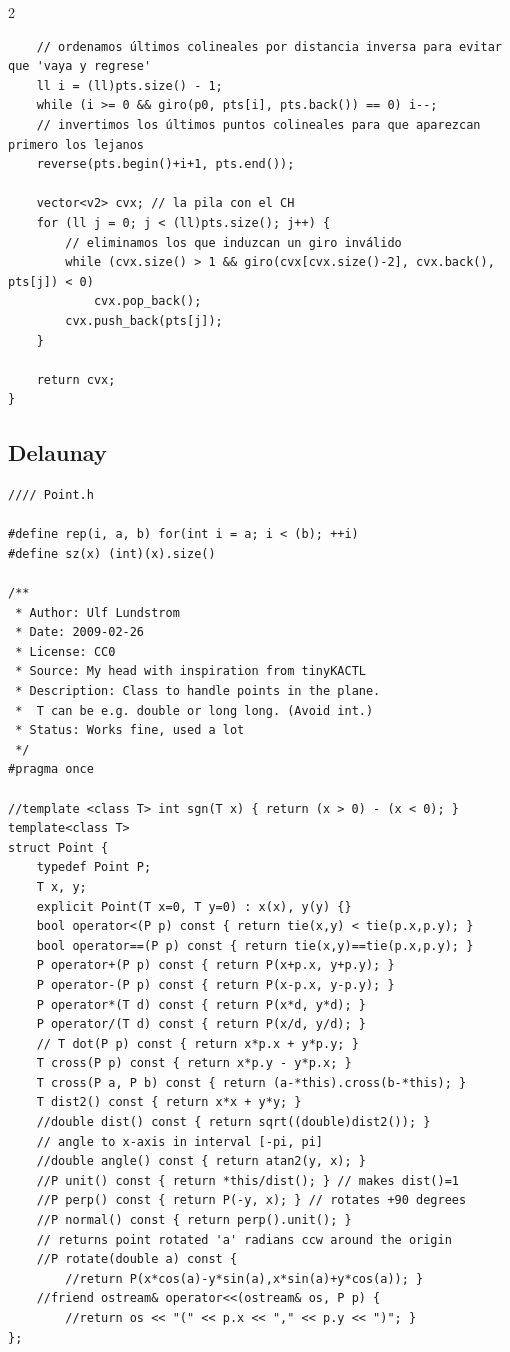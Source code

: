 \documentclass[twoside]{article}
\begin{document}
\begin{multicols*}{2}
\begin{verbatim}
    // ordenamos últimos colineales por distancia inversa para evitar que 'vaya y regrese'
    ll i = (ll)pts.size() - 1;
    while (i >= 0 && giro(p0, pts[i], pts.back()) == 0) i--;
    // invertimos los últimos puntos colineales para que aparezcan primero los lejanos
    reverse(pts.begin()+i+1, pts.end());

    vector<v2> cvx; // la pila con el CH
    for (ll j = 0; j < (ll)pts.size(); j++) {
        // eliminamos los que induzcan un giro inválido
        while (cvx.size() > 1 && giro(cvx[cvx.size()-2], cvx.back(), pts[j]) < 0)
            cvx.pop_back();
        cvx.push_back(pts[j]);
    }

    return cvx;
}

\end{verbatim}

	{
		\subsection*{Delaunay}
	}
	\begin{verbatim}
//// Point.h

#define rep(i, a, b) for(int i = a; i < (b); ++i)
#define sz(x) (int)(x).size()

/**
 * Author: Ulf Lundstrom
 * Date: 2009-02-26
 * License: CC0
 * Source: My head with inspiration from tinyKACTL
 * Description: Class to handle points in the plane.
 * 	T can be e.g. double or long long. (Avoid int.)
 * Status: Works fine, used a lot
 */
#pragma once

//template <class T> int sgn(T x) { return (x > 0) - (x < 0); }
template<class T>
struct Point {
	typedef Point P;
	T x, y;
	explicit Point(T x=0, T y=0) : x(x), y(y) {}
	bool operator<(P p) const { return tie(x,y) < tie(p.x,p.y); }
	bool operator==(P p) const { return tie(x,y)==tie(p.x,p.y); }
	P operator+(P p) const { return P(x+p.x, y+p.y); }
	P operator-(P p) const { return P(x-p.x, y-p.y); }
	P operator*(T d) const { return P(x*d, y*d); }
	P operator/(T d) const { return P(x/d, y/d); }
	// T dot(P p) const { return x*p.x + y*p.y; }
	T cross(P p) const { return x*p.y - y*p.x; }
	T cross(P a, P b) const { return (a-*this).cross(b-*this); }
	T dist2() const { return x*x + y*y; }
	//double dist() const { return sqrt((double)dist2()); }
	// angle to x-axis in interval [-pi, pi]
	//double angle() const { return atan2(y, x); }
	//P unit() const { return *this/dist(); } // makes dist()=1
	//P perp() const { return P(-y, x); } // rotates +90 degrees
	//P normal() const { return perp().unit(); }
	// returns point rotated 'a' radians ccw around the origin
	//P rotate(double a) const {
		//return P(x*cos(a)-y*sin(a),x*sin(a)+y*cos(a)); }
	//friend ostream& operator<<(ostream& os, P p) {
		//return os << "(" << p.x << "," << p.y << ")"; }
};


\end{verbatim}
\end{multicols*}
\end{document}
